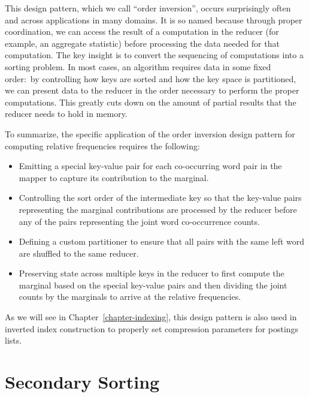 This design pattern, which we call ``order inversion'', occurs
surprisingly often and across applications in many domains.  It is so
named because through proper coordination, we can access the result of
a computation in the reducer (for example, an aggregate statistic)
before processing the data needed for that computation.  The key
insight is to convert the sequencing of computations into a sorting
problem.  In most cases, an algorithm requires data in some fixed
order:\ by controlling how keys are sorted and how the key space is
partitioned, we can present data to the reducer in the order necessary
to perform the proper computations.  This greatly cuts down on the
amount of partial results that the reducer needs to hold in memory.

To summarize, the specific application of the order inversion design
pattern for computing relative frequencies requires the
following:

\begin{itemize}

\item Emitting a special key-value pair for each co-occurring word
  pair in the mapper to capture its contribution to the marginal.

\item Controlling the sort order of the intermediate key so that the
  key-value pairs representing the marginal contributions are
  processed by the reducer before any of the pairs representing the
  joint word co-occurrence counts.

\item Defining a custom partitioner to ensure that all pairs with the
  same left word are shuffled to the same reducer.

\item Preserving state across multiple keys in the reducer to first
  compute the marginal based on the special key-value pairs and then
  dividing the joint counts by the marginals to arrive at the
  relative frequencies.

\end{itemize}

\noindent As we will see in Chapter~\ref{chapter-indexing}, this design
pattern is also used in inverted index construction to properly set
compression parameters for postings lists.

\section{Secondary Sorting}
\label{chapter3:secondary-sorting}

